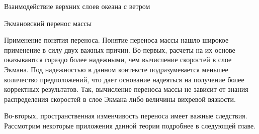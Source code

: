 \begin{chapter}{Взаимодействие верхних слоев океана с ветром}
\begin{section}{Экмановский перенос массы}
\begin{paragraph}{Применение понятия переноса.}
Понятие переноса массы%
 нашло широкое применение в силу двух важных 
причин. Во-первых, расчеты на их основе оказываются гораздо более надежными,
чем вычисление скоростей в слое Экмана. Под надежностью в данном контексте
подразумевается меньшее количество предположений, что дает основание надеяться
на получение более корректных результатов. Так, вычисление переноса массы
не зависит от знания распределения скоростей в слое Экмана либо величины
вихревой вязкости.
%

Во-вторых, пространственная изменчивость переноса имеет важные следствия.
Рассмотрим некоторые приложения данной теории подробнее в следующей главе.
%
\end{paragraph}
\end{section}


\end{chapter}
